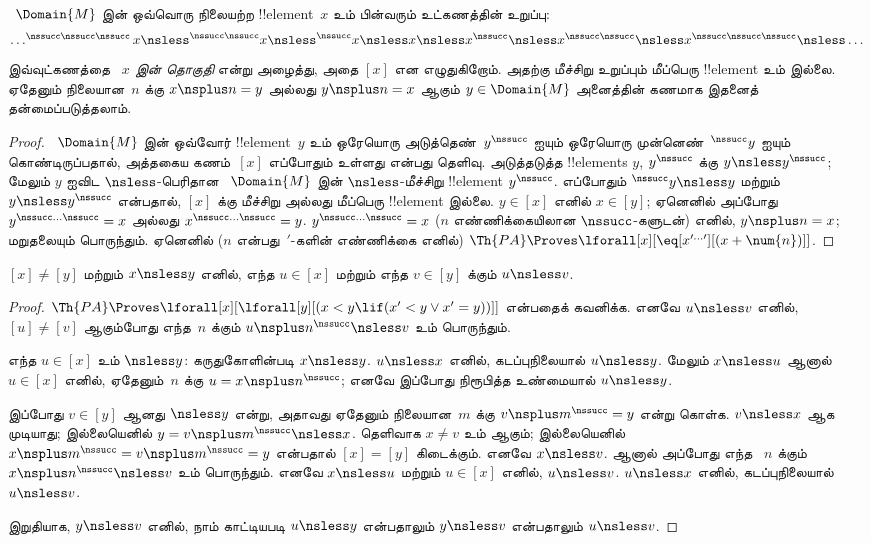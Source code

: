 \documentclass[../../../include/open-logic-section]{subfiles}
\begin{document}
\begin{prop}
~$\Domain{M}$ இன் ஒவ்வொரு நிலையற்ற !!{element}~$x$ உம் பின்வரும்
உட்கணத்தின் உறுப்பு:
\[
\dots ^{\nssucc\nssucc\nssucc}x \nsless ^{\nssucc\nssucc}x \nsless
^{\nssucc}x \nsless x \nsless x^{\nssucc} \nsless x^{\nssucc\nssucc}
\nsless x^{\nssucc\nssucc\nssucc} \nsless \dots
\]
இவ்வுட்கணத்தை \emph{~$x$ இன் தொகுதி} என்று அழைத்து, அதை $[x]$ என
எழுதுகிறோம். அதற்கு மீச்சிறு உறுப்பும் மீப்பெரு !!{element} உம்
இல்லை. ஏதேனும் நிலையான~$n$ க்கு $x \nsplus n = y$ அல்லது
$y \nsplus n = x$ ஆகும் $y \in \Domain{M}$ அனைத்தின் கணமாக
இதனைத் தன்மைப்படுத்தலாம்.
\end{prop}

\begin{proof}
~$\Domain{M}$ இன் ஒவ்வோர் !!{element}~$y$ உம் ஒரேயொரு
அடுத்தெண்~$y^\nssucc$ ஐயும் ஒரேயொரு முன்னெண்~$^\nssucc y$ ஐயும்
கொண்டிருப்பதால், அத்தகைய கணம்~$[x]$ எப்போதும் உள்ளது என்பது தெளிவு.
அடுத்தடுத்த !!{element}s $y$, $y^\nssucc$ க்கு
$y \nsless y^\nssucc$; மேலும் $y$ ஐவிட $\nsless$-பெரிதான
~$\Domain{M}$ இன் $\nsless$-மீச்சிறு !!{element} $y^\nssucc$.
எப்போதும் $^\nssucc y \nsless y$ மற்றும் $y \nsless y^\nssucc$
என்பதால், $[x]$ க்கு மீச்சிறு அல்லது மீப்பெரு !!{element} இல்லை.
$y \in [x]$ எனில் $x \in [y]$; ஏனெனில் அப்போது
$y^{\nssucc\dots\nssucc} = x$ அல்லது
$x^{\nssucc\dots\nssucc} = y$. $y^{\nssucc\dots\nssucc} = x$
($n$ எண்ணிக்கையிலான $\nssucc$-களுடன்) எனில், $y \nsplus n = x$;
மறுதலையும் பொருந்தும். ஏனெனில் ($n$ என்பது~$\prime$-களின் எண்ணிக்கை
எனில்) $\Th{PA} \Proves \lforall[x][\eq[x^{\prime\dots\prime}][(x +
    \num{n})]]$.
\end{proof}

\begin{prop}
$[x] \neq [y]$ மற்றும் $x \nsless y$ எனில், எந்த
$u \in [x]$ மற்றும் எந்த $v \in [y]$ க்கும் $u \nsless v$.
\end{prop}

\begin{proof}
$\Th{PA} \Proves \lforall[x][\lforall[y][(x < y \lif (x' < y
    \lor x' = y))]]$ என்பதைக் கவனிக்க. எனவே $u \nsless v$ எனில்,
$[u] \neq [v]$ ஆகும்போது எந்த~$n$ க்கும்
$u \nsplus
n^\nssucc \nsless v$ உம் பொருந்தும்.

எந்த $u \in [x]$ உம் $\nsless y$: கருதுகோளின்படி
$x \nsless y$. $u
\nsless x$ எனில், கடப்புநிலையால் $u \nsless y$. மேலும்
$x \nsless u$ ஆனால் $u
\in [x]$ எனில், ஏதேனும்~$n$ க்கு $u = x\nsplus n^\nssucc$;
எனவே இப்போது நிரூபித்த உண்மையால் $u \nsless y$.

இப்போது $v \in [y]$ ஆனது $\nsless y$ என்று, அதாவது ஏதேனும்
நிலையான~$m$ க்கு $v \nsplus
m^\nssucc = y$ என்று கொள்க. $v \nsless x$ ஆக முடியாது; இல்லையெனில்
$y = v \nsplus m^\nssucc \nsless x$. தெளிவாக $x \neq
v$ உம் ஆகும்; இல்லையெனில்
$x \nsplus m^\nssucc = v \nsplus m^\nssucc = y$ என்பதால்
$[x] = [y]$ கிடைக்கும். எனவே $x \nsless v$. ஆனால் அப்போது எந்த
~$n$ க்கும் $x \nsplus
n^\nssucc \nsless v$ உம் பொருந்தும். எனவே $x \nsless u$ மற்றும்
$u \in
[x]$ எனில், $u \nsless v$. $u \nsless x$ எனில், கடப்புநிலையால்
$u \nsless v$.

இறுதியாக, $y \nsless v$ எனில், நாம் காட்டியபடி $u
\nsless y$ என்பதாலும் $y \nsless v$ என்பதாலும் $u \nsless v$.
\end{proof}
\end{document}
